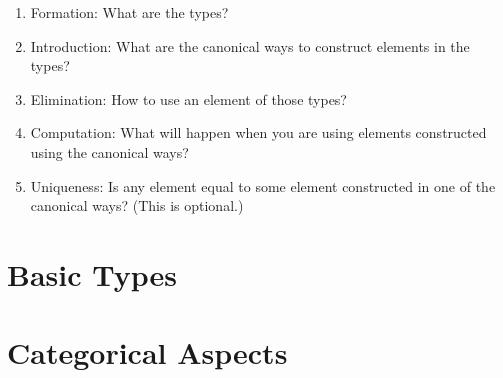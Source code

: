\documentclass[11pt]{article}
\begin{document}
\begin{enumerate}
  \item Formation: What are the types?
  \item Introduction: What are the canonical ways to construct elements in the types?
  \item Elimination: How to use an element of those types?
  \item Computation: What will happen when you are using elements constructed using the canonical ways?
  \item Uniqueness: Is any element equal to some element constructed in one of the canonical ways?
    (This is optional.)
\end{enumerate}

\section{Basic Types}

\section{Categorical Aspects}
\end{document}
